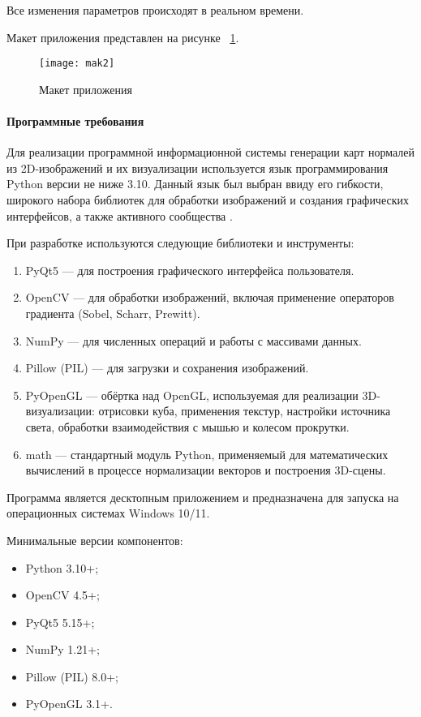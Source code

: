 Все изменения параметров происходят в реальном времени.

Макет приложения представлен на рисунке ~\ref{mak2:image}.

\begin{figure}[ht]
	\texttt{[image: mak2]}
	\caption{Макет приложения}
	\label{mak2:image}
\end{figure}
\paragraph{Программные требования}

Для реализации программной информационной системы генерации карт нормалей из 2D-изображений и их визуализации используется язык программирования Python версии не ниже 3.10. Данный язык был выбран ввиду его гибкости, широкого набора библиотек для обработки изображений и создания графических интерфейсов, а также активного сообщества \cite{ramalho2022}.

При разработке используются следующие библиотеки и инструменты:
\begin{enumerate}
	\item PyQt5 — для построения графического интерфейса пользователя.
	\item OpenCV — для обработки изображений, включая применение операторов градиента (Sobel, Scharr, Prewitt).
	\item NumPy — для численных операций и работы с массивами данных.
	\item Pillow (PIL) — для загрузки и сохранения изображений.
	\item PyOpenGL — обёртка над OpenGL, используемая для реализации 3D-визуализации: отрисовки куба, применения текстур, настройки источника света, обработки взаимодействия с мышью и колесом прокрутки.
	\item math — стандартный модуль Python, применяемый для математических вычислений в процессе нормализации векторов и построения 3D-сцены.
\end{enumerate}

Программа является десктопным приложением и предназначена для запуска на операционных системах Windows 10/11.

Минимальные версии компонентов:
\begin{itemize}
	\item Python 3.10+;
	\item OpenCV 4.5+;
	\item PyQt5 5.15+;
	\item NumPy 1.21+;
	\item Pillow (PIL) 8.0+;
	\item PyOpenGL 3.1+.
\end{itemize}

